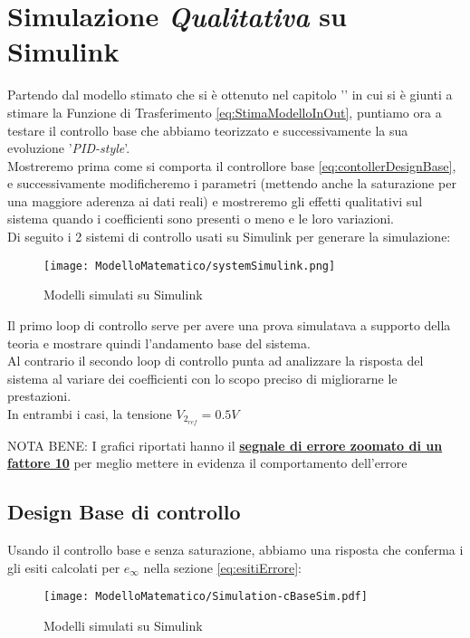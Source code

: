 \newpage

\section{Simulazione \textit{Qualitativa} su Simulink}
Partendo dal modello stimato che si è ottenuto nel capitolo '' in cui si è giunti a stimare la Funzione di Trasferimento \ref{eq:StimaModelloInOut}, puntiamo ora a testare il controllo base che abbiamo teorizzato e successivamente la sua evoluzione '\textit{PID-style}'.\\
Mostreremo prima come si comporta il controllore base \ref{eq:contollerDesignBase}, e successivamente modificheremo i parametri (mettendo anche la saturazione per una maggiore aderenza ai dati reali) e mostreremo gli effetti qualitativi sul sistema quando i coefficienti sono presenti o meno e le loro variazioni.\\
Di seguito i 2 sistemi di controllo usati su Simulink per generare la simulazione:\vspace{-4mm}
\begin{figure}[H]
	\centering
	\caption[Modelli simulati su Simulink]{Modelli simulati su Simulink}
	\texttt{[image: ModelloMatematico/systemSimulink.png]}
\end{figure}\vspace{-6mm}
\noindent
Il primo loop di controllo  serve per avere una prova simulatava a supporto della teoria e mostrare quindi l'andamento base del sistema.\\
Al contrario il secondo loop di controllo punta ad analizzare la risposta del sistema al variare dei coefficienti con lo scopo preciso di migliorarne le prestazioni.\\
In entrambi i casi, la tensione $ V_{2_{ref}} = 0.5V$\\
\begin{spacing}{1}
	\noindent
	{\footnotesize NOTA BENE: I grafici riportati hanno il \textbf{\underline{segnale di errore zoomato di un fattore 10}} per meglio mettere in evidenza il comportamento dell'errore}
\end{spacing}

\newpage

\subsection{Design Base di controllo}
Usando il controllo base e senza saturazione, abbiamo una risposta che conferma i gli esiti calcolati per $ e_\infty $ nella sezione \ref{eq:esitiErrore}:
\begin{figure}[H]
	\centering
	\caption[Modelli simulati su Simulink]{Modelli simulati su Simulink}
	\texttt{[image: ModelloMatematico/Simulation-cBaseSim.pdf]}
\end{figure}

